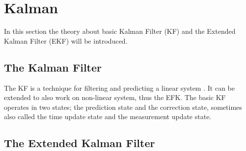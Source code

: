 \documentclass[Main]{subfiles}
\begin{document}
\section{Kalman} %
	\label{sec:kalman}
In this section the theory about basic Kalman Filter (KF) and the Extended Kalman Filter (EKF) will be introduced.
\subsection{The Kalman Filter}
The KF is a technique for filtering and predicting a linear system . 
It can be extended to also work on non-linear system, thus the EFK. 
The basic KF operates in two states; the prediction state and the correction state, sometimes also called the time update state and the measurement update state.



\subsection{The Extended Kalman Filter}
\end{document}
